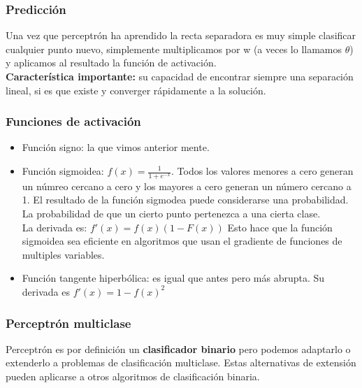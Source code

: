 \documentclass[titlepage,a4paper]{article}
\begin{document}
\subsubsection*{Predicción}Una vez que perceptrón ha aprendido la recta separadora es muy simple clasificar cualquier punto nuevo, simplemente multiplicamos por w (a veces lo llamamos $\theta$) y aplicamos al resultado la función de activación. \\

\textbf{Característica importante:} su capacidad de encontrar siempre una separación lineal, si es que existe y converger rápidamente a la solución. 

\subsubsection*{Funciones de activación}
\begin{itemize}
\item Función signo: la que vimos anterior mente. 
\item Función sigmoidea: $f(x) = \frac{1}{1+e^{-x}}$. Todos los valores menores a cero generan un númreo cercano a cero y los mayores a cero generan un número cercano a 1.  El resultado de la función sigmodea puede considerarse una probabilidad. La probabilidad de que un cierto punto pertenezca a una cierta clase. \\
La derivada es: $f'(x) = f(x) (1-F(x))$ Esto hace que la función sigmoidea sea eficiente en algoritmos que usan el gradiente de funciones  de multiples variables. 
\item Función tangente hiperbólica: es igual que antes pero más abrupta. Su derivada es $f'(x) = 1-f(x)^2$ 
\end{itemize}

\subsubsection*{Perceptrón multiclase}
Perceptrón es por definición un \textbf{clasificador binario} pero podemos adaptarlo o extenderlo a problemas de clasificación multiclase. Estas alternativas de extensión pueden aplicarse a otros algoritmos de clasificación binaria. \\
\end{document}
